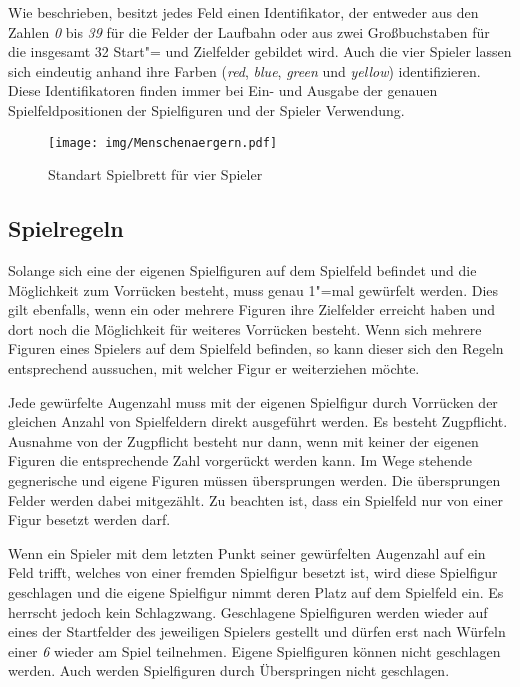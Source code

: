 Wie beschrieben, besitzt jedes Feld einen Identifikator, der entweder aus den Zahlen \emph{0} bis \emph{39} für die Felder der Laufbahn oder aus zwei Großbuchstaben für die insgesamt 32 Start"= und Zielfelder gebildet wird. Auch die vier Spieler lassen sich eindeutig anhand ihre Farben (\emph{red}, \emph{blue}, \emph{green} und \emph{yellow}) identifizieren. Diese Identifikatoren finden immer bei Ein- und Ausgabe der genauen Spielfeldpositionen der Spielfiguren und der Spieler Verwendung.

\begin{figure}[h!]
\centering
\texttt{[image: img/Menschenaergern.pdf]}
\caption{Standart Spielbrett für vier Spieler\label{fig:Menschenaergern}}
\end{figure}

\subsection*{Spielregeln}
Solange sich eine der eigenen Spielfiguren auf dem Spielfeld befindet und die Möglichkeit zum Vorrücken besteht, muss genau 1"=mal gewürfelt werden. Dies gilt ebenfalls, wenn ein oder mehrere Figuren ihre Zielfelder erreicht haben und dort noch die Möglichkeit für weiteres Vorrücken besteht. Wenn sich mehrere Figuren eines Spielers auf dem Spielfeld befinden, so kann dieser sich den Regeln entsprechend aussuchen, mit welcher Figur er weiterziehen möchte.

Jede gewürfelte Augenzahl muss mit der eigenen Spielfigur durch Vorrücken der gleichen Anzahl von Spielfeldern direkt ausgeführt werden. Es besteht Zugpflicht. Ausnahme von der Zugpflicht besteht nur dann, wenn mit keiner der eigenen Figuren die entsprechende Zahl vorgerückt werden kann. Im Wege stehende gegnerische und eigene Figuren müssen übersprungen werden. Die übersprungen Felder werden dabei mitgezählt. Zu beachten ist, dass ein Spielfeld nur von einer Figur besetzt werden darf.

Wenn ein Spieler mit dem letzten Punkt seiner gewürfelten Augenzahl auf ein Feld trifft, welches von einer fremden Spielfigur besetzt ist, wird diese Spielfigur geschlagen und die eigene Spielfigur nimmt deren Platz auf dem Spielfeld ein. Es herrscht jedoch kein Schlagzwang. Geschlagene Spielfiguren werden wieder auf eines der Startfelder des jeweiligen Spielers gestellt und dürfen erst nach Würfeln einer \emph{6} wieder am Spiel teilnehmen. Eigene Spielfiguren können nicht geschlagen werden. Auch werden Spielfiguren durch Überspringen nicht geschlagen.

